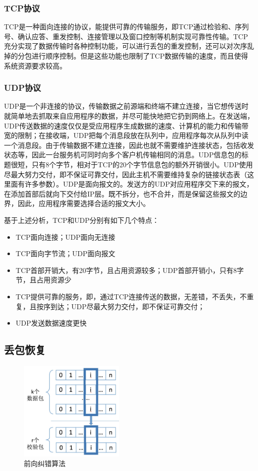 \documentclass[onecolumn]{article}
\begin{document}
\begin{CJK*}{UTF8}{gbsn}
		\subsubsection{TCP协议}
		TCP是一种面向连接的协议，能提供可靠的传输服务，即TCP通过检验和、序列号、确认应答、重发控制、连接管理以及窗口控制等机制实现可靠性传输。TCP充分实现了数据传输时各种控制功能，可以进行丢包的重发控制，还可以对次序乱掉的分包进行顺序控制。但是这些功能也限制了TCP数据传输的速度，而且使得系统资源要求较高。
		\subsubsection{UDP协议}
		
		UDP是一个非连接的协议，传输数据之前源端和终端不建立连接，当它想传送时就简单地去抓取来自应用程序的数据，并尽可能快地把它扔到网络上。在发送端，UDP传送数据的速度仅仅是受应用程序生成数据的速度、计算机的能力和传输带宽的限制；在接收端，UDP把每个消息段放在队列中，应用程序每次从队列中读一个消息段。由于传输数据不建立连接，因此也就不需要维护连接状态，包括收发状态等，因此一台服务机可同时向多个客户机传输相同的消息。UDP信息包的标题很短，只有8个字节，相对于TCP的20个字节信息包的额外开销很小。UDP使用尽最大努力交付，即不保证可靠交付，因此主机不需要维持复杂的链接状态表（这里面有许多参数）。UDP是面向报文的。发送方的UDP对应用程序交下来的报文，在添加首部后就向下交付给IP层。既不拆分，也不合并，而是保留这些报文的边界，因此，应用程序需要选择合适的报文大小。
		
		基于上述分析，TCP和UDP分别有如下几个特点：
		\begin{itemize}
			\item TCP面向连接；UDP面向无连接
			\item TCP面向字节流；UDP面向报文
			\item TCP首部开销大，有20字节，且占用资源较多；UDP首部开销小，只有8字节，且占用资源少
			\item TCP提供可靠的服务，即，通过TCP连接传送的数据，无差错，不丢失，不重复，且按序到达；UDP尽最大努力交付，即不保证可靠交付；
			\item UDP发送数据速度更快
		\end{itemize}
		
		\subsection{丢包恢复}
		\begin{figure}[h]
			\centering
			\includegraphics[width=2in]{FEC.jpg}
			\caption{前向纠错算法}
			\label{fig:FEC}
		\end{figure}
		

\end{CJK*}
\end{document}
